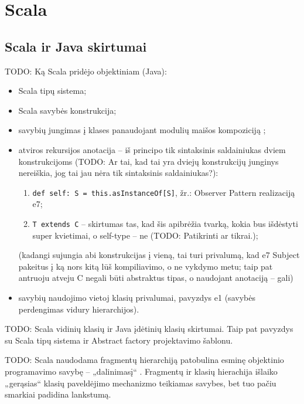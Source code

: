 \chapter{Scala}

\section{Scala ir Java skirtumai}

TODO: Ką Scala pridėjo objektiniam (Java):
\begin{itemize}
  \item Scala tipų sistema;
  \item Scala savybės  konstrukcija;
  \item savybių jungimas į klases panaudojant modulių maišos
    kompoziciją ;
  \item atviros rekursijos anotacija  –
    iš principo tik sintaksinis saldainiukas dviem konstrukcijoms
    (TODO: Ar tai, kad tai yra dviejų konstrukcijų junginys nereiškia,
    jog tai jau nėra tik sintaksinis saldainiukas?):
    \begin{enumerate}
      \item \verb|def self: S = this.asInstanceOf[S]|, žr.: Observer
        Pattern realizaciją e7;
      \item \verb|T extends C| – skirtumas tas, kad šis apibrėžia
        tvarką, kokia bus išdėstyti super kvietimai, o self-type
        – ne (TODO: Patikrinti ar tikrai.);
    \end{enumerate}
    (kadangi sujungia abi konstrukcijas į vieną, tai turi privalumą, kad
    e7 Subject pakeitus į ką nors kitą lūš kompiliavimo, o ne vykdymo
    metu; taip pat antruoju atveju C negali būti abstraktus tipas, o
    naudojant anotaciją – gali)
  \item savybių naudojimo vietoj klasių privalumai, pavyzdys e1
    (savybės perdengimas vidury hierarchijos).
\end{itemize}

TODO: Scala vidinių klasių ir Java įdėtinių klasių skirtumai. Taip pat
pavyzdys su Scala tipų sistema ir Abstract factory projektavimo šablonu.

TODO: Scala naudodama fragmentų hierarchiją patobulina esminę objektinio
programavimo savybę – „dalinimasį“ . Fragmentų ir klasių
hierachija išlaiko „gerąsias“ klasių paveldėjimo mechanizmo teikiamas
savybes, bet tuo pačiu smarkiai padidina lankstumą.


